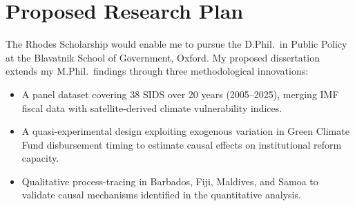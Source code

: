 \section{Proposed Research Plan}

The Rhodes Scholarship would enable me to pursue the D.Phil.\ in Public Policy at the
Blavatnik School of Government, Oxford. My proposed dissertation extends my M.Phil.\
findings through three methodological innovations:

\begin{itemize}[leftmargin=12pt, nosep, itemsep=2pt, before=\vspace{0.2em}]
  \item A panel dataset covering 38 SIDS over 20 years (2005--2025), merging IMF fiscal
        data with satellite-derived climate vulnerability indices.
  \item A quasi-experimental design exploiting exogenous variation in Green Climate Fund
        disbursement timing to estimate causal effects on institutional reform capacity.
  \item Qualitative process-tracing in Barbados, Fiji, Maldives, and Samoa to validate
        causal mechanisms identified in the quantitative analysis.
\end{itemize}
